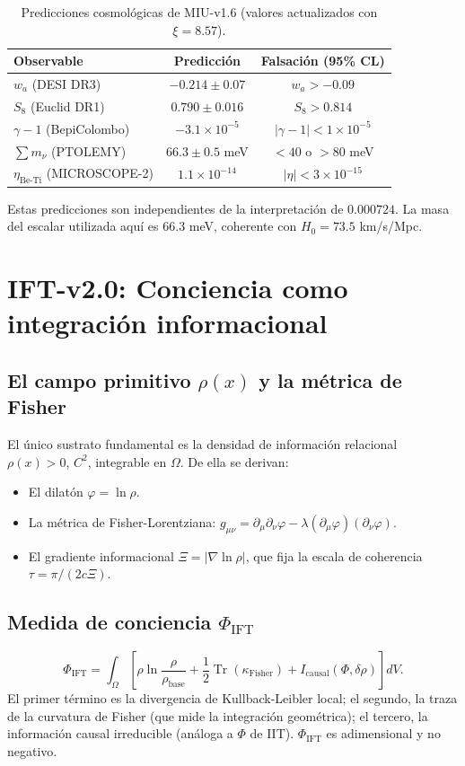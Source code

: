 \documentclass[12pt, a4paper]{article}
\theoremstyle{miuThm}
\theoremstyle{remark}
\newcommand{\eps}{0.000724}
\begin{document}
\begin{table}[h!]
\centering
\caption{Predicciones cosmológicas de MIU-v1.6 (valores actualizados con $\xi=8.57$).}
\label{tab:cosmo_pred}
\begin{tabular}{lcc}
\toprule
\textbf{Observable} & \textbf{Predicción} & \textbf{Falsación (95\% CL)} \\
\midrule
$w_a$ (DESI DR3) & $-0.214 \pm 0.07$ & $w_a > -0.09$ \\
$S_8$ (Euclid DR1) & $0.790 \pm 0.016$ & $S_8 > 0.814$ \\
$\gamma-1$ (BepiColombo) & $-3.1\times10^{-5}$ & $|\gamma-1| < 1\times10^{-5}$ \\
$\sum m_\nu$ (PTOLEMY) & $66.3 \pm 0.5$ meV & $<40$ o $>80$ meV \\
$\eta_{\text{Be-Ti}}$ (MICROSCOPE-2) & $1.1\times10^{-14}$ & $|\eta| < 3\times10^{-15}$ \\
\bottomrule
\end{tabular}
\end{table}

Estas predicciones son independientes de la interpretación de $\eps$. La masa del escalar utilizada aquí es $66.3$ meV, coherente con $H_0=73.5$ km/s/Mpc.

\clearpage

\section{IFT-v2.0: Conciencia como integración informacional}
\label{sec:IFT}

\subsection{El campo primitivo $\rho(x)$ y la métrica de Fisher}
El único sustrato fundamental es la densidad de información relacional $\rho(x) > 0$, $C^2$, integrable en $\Omega$. De ella se derivan:
\begin{itemize}
\item El dilatón $\varphi = \ln\rho$.
\item La métrica de Fisher-Lorentziana: $g_{\mu\nu} = \partial_\mu\partial_\nu\varphi - \lambda (\partial_\mu\varphi)(\partial_\nu\varphi)$.
\item El gradiente informacional $\Xi = |\nabla\ln\rho|$, que fija la escala de coherencia $\tau = \pi/(2c\Xi)$.
\end{itemize}

\subsection{Medida de conciencia $\Phi_{\text{IFT}}$}
\begin{equation}
\Phi_{\text{IFT}} = \int_{\Omega} \left[ \rho\ln\frac{\rho}{\rho_{\text{base}}} + \frac12 \operatorname{Tr}(\kappa_{\text{Fisher}}) + I_{\text{causal}}(\Phi,\delta\rho) \right] dV.
\end{equation}
El primer término es la divergencia de Kullback-Leibler local; el segundo, la traza de la curvatura de Fisher (que mide la integración geométrica); el tercero, la información causal irreducible (análoga a $\Phi$ de IIT). $\Phi_{\text{IFT}}$ es adimensional y no negativo.
\end{document}
